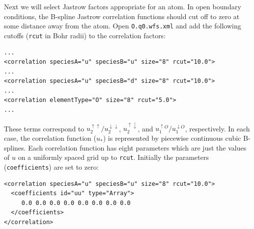 Next we will select Jastrow factors appropriate for an atom.  In open boundary conditions, the B-spline Jastrow correlation functions should cut off to zero at some distance away from the atom.  Open \texttt{O.q0.wfs.xml} and add the following cutoffs (\texttt{rcut} in Bohr radii) to the correlation factors:
\begin{lstlisting}
...
<correlation speciesA="u" speciesB="u" size="8" rcut="10.0">
...
<correlation speciesA="u" speciesB="d" size="8" rcut="10.0">
...
<correlation elementType="O" size="8" rcut="5.0">
...
\end{lstlisting}
\noindent
These terms correspond to $u_2^{\uparrow\uparrow}/u_2^{\downarrow\downarrow}$, $u_2^{\uparrow\downarrow}$, and $u_1^{\uparrow O}/u_1^{\downarrow O}$, respectively.  In each case, the correlation function ($u_*$) is represented by piecewise continuous cubic B-splines.  Each correlation function has eight parameters which are just the values of $u$ on a uniformly spaced grid up to \texttt{rcut}.  Initially the parameters (\texttt{coefficients}) are set to zero:
\begin{lstlisting}
<correlation speciesA="u" speciesB="u" size="8" rcut="10.0">
  <coefficients id="uu" type="Array">
     0.0 0.0 0.0 0.0 0.0 0.0 0.0 0.0
  </coefficients>
</correlation>
\end{lstlisting}

